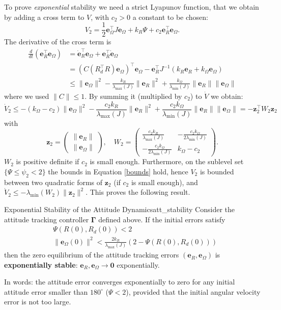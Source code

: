 \documentclass[10pt, a4paper]{report}
\begin{document}
\noindent To prove \textit{exponential} stability we need a strict Lyapunov function, that we obtain by adding a cross term to $V$, with $c_2>0$ a constant to be chosen:\begin{equation}
    V_2=\frac{1}{2}\mathbf e_\Omega^\top J\mathbf e_\Omega+k_R\Psi+c_2\mathbf e_R^\top\mathbf e_\Omega.
\end{equation}
The derivative of the cross term is\begin{align}
    \frac{d}{dt}\left(\mathbf e_R^\top\mathbf e_\Omega\right)&=\dot{\mathbf e}_R^\top\mathbf e_\Omega+\mathbf e_R^\top\dot{\mathbf e}_\Omega\\
    &=(C(R_d^\top R)\mathbf e_\Omega)^\top\mathbf e_\Omega-\mathbf e_R^\top J^{-1}(k_R\mathbf e_R+k_\Omega\mathbf e_\Omega)\\
    &\le\|\mathbf e_\Omega\|^2-\frac{k_R}{\lambda_{\max}(J)}\|\mathbf e_R\|^2+\frac{k_\Omega}{\lambda_{\min}(J)}\|\mathbf e_R\|\|\mathbf e_\Omega\|
\end{align}
where we used $\|C\|\le1$. By summing it (multiplied by $c_2$) to $\dot V$ we obtain:\begin{equation}
    \dot V_2\le-(k_\Omega-c_2)\|\mathbf e_\Omega\|^2-\frac{c_2k_R}{\lambda_{\max}(J)}\|\mathbf e_R\|^2+\frac{c_2k_\Omega}{\lambda_{\min}(J)}\|\mathbf e_R\|\|\mathbf e_\Omega\|=-\mathbf z_2^\top W_2\mathbf z_2
\end{equation}
with\begin{equation}
    \mathbf z_2=\begin{pmatrix}
        \|\mathbf e_R\|\\ \|\mathbf e_\Omega\|
    \end{pmatrix},\quad W_2=\begin{pmatrix}
        \frac{c_2k_R}{\lambda_{\max}(J)}&-\frac{c_2k_\Omega}{2\lambda_{\min}(J)}\\[1ex]
        -\frac{c_2k_\Omega}{2\lambda_{\min}(J)}&k_\Omega-c_2
    \end{pmatrix}.
\end{equation}
$W_2$ is positive definite if $c_2$ is small enough. Furthermore, on the sublevel set $\{\Psi\le\psi_2<2\}$ the bounds in Equation \eqref{bounds} hold, hence $V_2$ is bounded between two quadratic forms of $\mathbf z_2$ (if $c_2$ is small enough), and $\dot V_2\le-\lambda_{\min}(W_2)\|\mathbf z_2\|^2$. This proves the following result.
\begin{boxproposition}{Exponential Stability of the Attitude Dynamics}{att_stability}
Consider the attitude tracking controller $\boldsymbol\Gamma$ defined above. If the initial errors satisfy\begin{align}
    &\Psi(R(0),R_d(0))<2\\
    &\|\mathbf e_\Omega(0)\|^2<\frac{2k_R}{\lambda_{\max}(J)}\left(2-\Psi(R(0),R_d(0))\right)
\end{align}
then the zero equilibrium of the attitude tracking errors $(\mathbf e_R,\mathbf e_\Omega)$ is \textbf{exponentially stable}: $\mathbf e_R,\mathbf e_\Omega\to\mathbf 0$ exponentially.
\end{boxproposition}
\noindent In words: the attitude error converges exponentially to zero for any initial attitude error smaller than $180^\circ$ ($\Psi<2$), provided that the initial angular velocity error is not too large.
\end{document}
